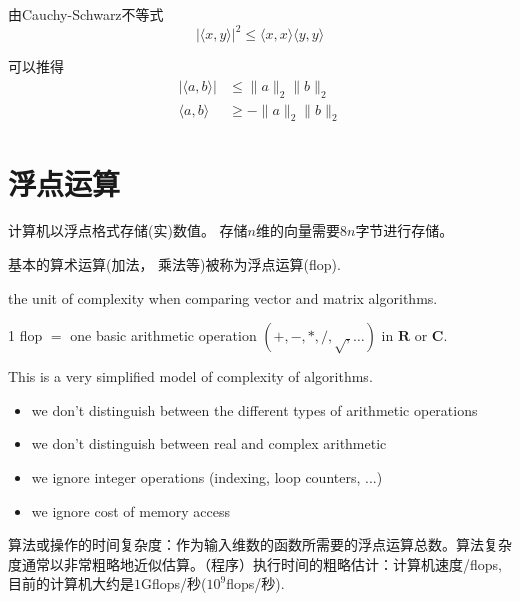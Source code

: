 \begin{corollary}
    由Cauchy-Schwarz不等式
    \begin{equation}
    |\langle x, y\rangle|^{2} \leq\langle x, x\rangle\langle y, y\rangle
    \end{equation}

    可以推得
    \begin{equation}\begin{aligned}
        |\langle a,b \rangle| &\le \| a \|_2 \| b \|_2\\
        \langle a,b \rangle &\ge -\| a \|_2 \| b \|_2
    \end{aligned} \end{equation}
\end{corollary}


\section{浮点运算}

计算机以浮点格式存储(实)数值。 存储$n$维的向量需要$8n$字节进行存储。

基本的算术运算(加法， 乘法等)被称为浮点运算(flop). 

\begin{definition}
    the unit of complexity when comparing vector and matrix algorithms.

    1 flop $ = $ one basic arithmetic operation $ (+,-, *, /, \sqrt{,} \ldots) $ in $ \mathbf{R} $ or $ \mathbf{C} $.
\end{definition}

\begin{remark}
    This is a very simplified model of complexity of algorithms.

    \begin{itemize}
        \item we don't distinguish between the different types of arithmetic operations
        \item we don't distinguish between real and complex arithmetic
        \item we ignore integer operations (indexing, loop counters, ...)
        \item we ignore cost of memory access
    \end{itemize}
\end{remark}

算法或操作的时间复杂度：作为输入维数的函数所需要的浮点运算总数。算法复杂度通常以非常粗略地近似估算。（程序）执行时间的粗略估计：计算机速度/flops,目前的计算机大约是$1$Gflops/秒($10^9$flops/秒).

